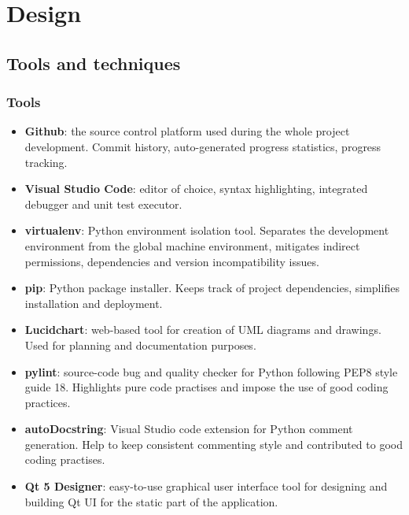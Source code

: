 \section{Design}

\subsection{Tools and techniques}

\subsubsection{Tools}
\begin{itemize}
	\item \textbf{Github}: the source control platform used during the whole project development. Commit history, auto-generated progress statistics, progress tracking.
	\item \textbf{Visual Studio Code}: editor of choice, syntax highlighting, integrated debugger and unit test executor.
	\item \textbf{virtualenv}: Python environment isolation tool. Separates the development environment from the global machine environment, mitigates indirect permissions, dependencies and version incompatibility issues.
	\item \textbf{pip}: Python package installer. Keeps track of project dependencies, simplifies installation and deployment.
	\item \textbf{Lucidchart}: web-based tool for creation of UML diagrams and drawings. Used for planning and documentation purposes. 
	\item \textbf{pylint}: source-code bug and quality checker for Python following PEP8 style guide {18}. Highlights pure code practises and impose the use of good coding practices.
	\item \textbf{autoDocstring}: Visual Studio code extension for Python comment generation. Help to keep consistent commenting style and contributed to good coding practises.
	\item \textbf{Qt 5 Designer}: easy-to-use graphical user interface tool for designing and building Qt UI for the static part of the application.
\end{itemize}

